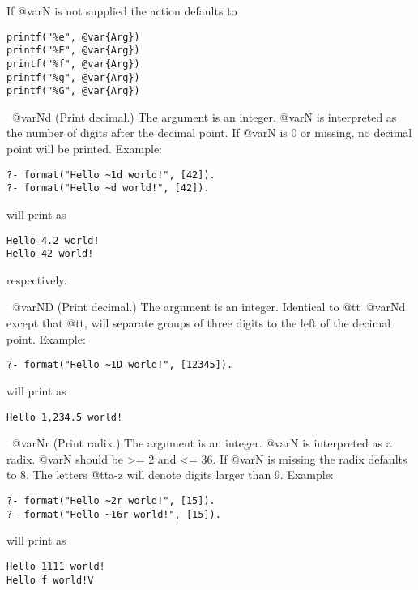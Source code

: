 \begin{description}
\begin{itemize}
{If @var{N} is not supplied the action defaults to

\begin{verbatim}
printf("%e", @var{Arg})
printf("%E", @var{Arg})
printf("%f", @var{Arg})
printf("%g", @var{Arg})
printf("%G", @var{Arg})
\end{verbatim}

\item ~@var{N}d
(Print decimal.) The argument is an integer. @var{N} is interpreted as the
number of digits after the decimal point.  If @var{N} is 0 or missing, no
decimal point will be printed.  Example:  

\begin{verbatim}
?- format("Hello ~1d world!", [42]).
?- format("Hello ~d world!", [42]).
\end{verbatim}

\noindent
will print as

\begin{verbatim}
Hello 4.2 world!
Hello 42 world!
\end{verbatim}

\noindent
respectively.

\item ~@var{N}D
(Print decimal.) The argument is an integer.  Identical to @tt{~@var{N}d}
except that @tt{,} will separate groups of three digits to the left of the
decimal point.  Example:  

\begin{verbatim}
?- format("Hello ~1D world!", [12345]).
\end{verbatim}

\noindent
will print as

\begin{verbatim}
Hello 1,234.5 world!
\end{verbatim}

\item ~@var{N}r
(Print radix.) The argument is an integer. @var{N} is interpreted as a radix.
@var{N} should be >= 2 and <= 36.  If @var{N} is missing the radix defaults to
8.  The letters @tt{a-z} will denote digits larger than 9.  Example:  

\begin{verbatim}
?- format("Hello ~2r world!", [15]).
?- format("Hello ~16r world!", [15]).
\end{verbatim}

\noindent
will print as

\begin{verbatim}
Hello 1111 world!
Hello f world!V
\end{verbatim}

}
\end{itemize}
\end{description}

